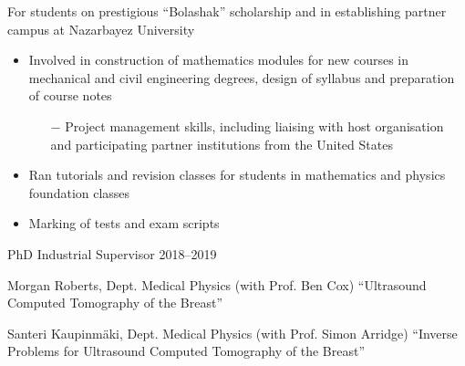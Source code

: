 \documentclass[11pt, a4paper]{awesome-cv}
\begin{document}
\begin{cventries}
{For students on prestigious \enquote{Bolashak} scholarship and in establishing partner campus at Nazarbayez University\newline
\begin{itemize}[leftmargin=2ex, nosep, noitemsep]
\setlength{\parskip}{0pt}
\item Involved in construction of mathematics modules for new courses in mechanical and civil engineering degrees, design of syllabus and preparation of course notes
\begin{itemize}
\item[\textcolor{awesome}{$\boldsymbol{-}$}] 
Project management skills, including liaising with host organisation and participating partner institutions from the United States
\end{itemize}
\item Ran tutorials and revision classes for students in mathematics and physics foundation classes
\item Marking of tests and exam scripts
\end{itemize}}
%
%
%
%
{PhD Industrial Supervisor}%
{}%
{2018--2019}%
{\begin{cvitems}%
\item Morgan Roberts, Dept. Medical Physics (with Prof. Ben Cox) \enquote{Ultrasound Computed Tomography of the Breast} %
\item Santeri Kaupinm\"{a}ki, Dept. Medical Physics (with Prof. Simon Arridge) \enquote{Inverse Problems for Ultrasound Computed Tomography of the Breast} %

\end{cvitems}}
\end{cventries}
\end{document}
